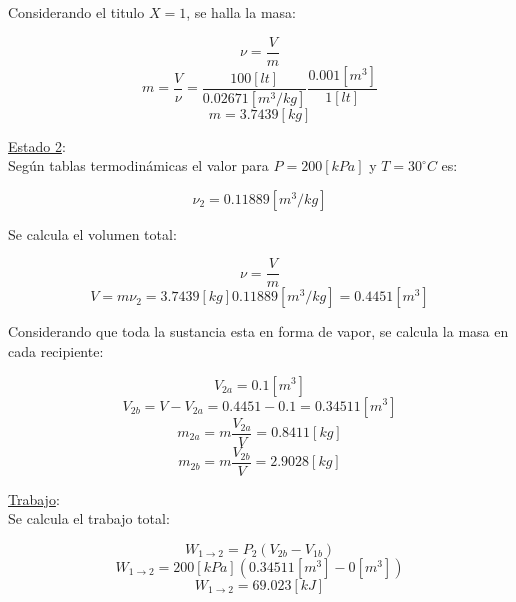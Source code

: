 \documentclass[letter,11pt]{article}
\begin{document}
\begin{enumerate}
Considerando el titulo $X=1$, se halla la masa:

\begin{equation*}
    \nu=\frac{V}{m}
\end{equation*}
\begin{equation*}
    m=\frac{V}{\nu}=\frac{100[lt]}{0.02671[m^3/kg]}\frac{0.001[m^3]}{1[lt]}
\end{equation*}
\begin{equation*}
    m=3.7439[kg]
\end{equation*}

\underline{Estado 2}:\\
Según tablas termodinámicas el valor para $P=200[kPa]$ y $T=30^\circ C$ es:

\begin{equation*}
    \nu_2=0.11889[m^3/kg]
\end{equation*}

Se calcula el volumen total:

\begin{equation*}
    \nu=\frac{V}{m}
\end{equation*}
\begin{equation*}
    V=m\nu_2=3.7439[kg]0.11889[m^3/kg]=0.4451[m^3]
\end{equation*}

Considerando que toda la sustancia esta en forma de vapor, se calcula la masa
en cada recipiente:

\begin{equation*}
    V_{2a}=0.1[m^3]
\end{equation*}
\begin{equation*}
    V_{2b}=V-V_{2a}=0.4451-0.1=0.34511[m^3]
\end{equation*}
\begin{equation*}
    m_{2a}=m\frac{V_{2a}}{V}=0.8411[kg]
\end{equation*}
\begin{equation*}
    m_{2b}=m\frac{V_{2b}}{V}=2.9028[kg]
\end{equation*}

\underline{Trabajo}:\\
Se calcula el trabajo total:

\begin{equation*}
    W_{1\rightarrow 2}=P_2(V_{2b}-V_{1b})
\end{equation*}
\begin{equation*}
    W_{1\rightarrow 2}=200[kPa](0.34511[m^3]-0[m^3])
\end{equation*}
\begin{equation*}
    W_{1\rightarrow 2}=69.023[kJ]
\end{equation*}

\end{enumerate}
\end{document}
